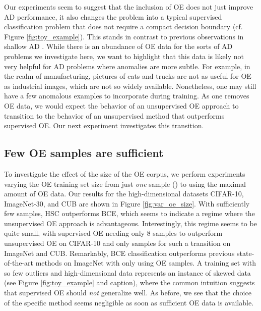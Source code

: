 \documentclass[10pt]{article} \usepackage[accepted]{stylefiles/tmlr}
\begin{document}
Our experiments seem to suggest that the inclusion of OE does not just improve AD performance, it also changes the problem into a typical supervised classification problem that does not require a compact decision boundary (cf. Figure \ref{fig:toy_example}).
This stands in contrast to previous observations in shallow AD \citep{tax2001, gornitz2013toward}.
While there is an abundance of OE data for the sorts of AD problems we investigate here, we want to highlight that this data is likely not very helpful for AD problems where anomalies are more subtle. 
For example, in the realm of manufacturing, pictures of cats and trucks are not as useful for OE as industrial images, which are not so widely available.
Nonetheless, one may still have a few anomalous examples to incorporate during training.
As one removes OE data, we would expect the behavior of an unsupervised OE approach to transition to the behavior of an unsupervised method that outperforms supervised OE.
Our next experiment investigates this transition.







\subsection{Few OE samples are sufficient}  \label{sec:exp_var_oe_size}
To investigate the effect of the size of the OE corpus, we perform experiments varying the OE training set size from just \emph{one} sample () to using the maximal amount of OE data.
Our results for the high-dimensional datasets CIFAR-10, ImageNet-30, and CUB are shown in Figure \ref{fig:var_oe_size}. 
With sufficiently few samples, HSC outperforms BCE, which seems to indicate a regime where the unsupervised OE approach is advantageous. 
Interestingly, this regime seems to be quite small, with supervised OE needing only 8 samples to outperform unsupervised OE on CIFAR-10 and only  samples for such a transition on ImageNet and CUB.
Remarkably, BCE classification outperforms previous state-of-the-art methods on ImageNet with only using  OE samples.
A training set with so few outliers and high-dimensional data represents an instance of skewed data (see Figure \ref{fig:toy_example} and caption), where the common intuition suggests that supervised OE should \emph{not} generalize well.
As before, we see that the choice of the specific method seems negligible as soon as sufficient OE data is available.
\end{document}
